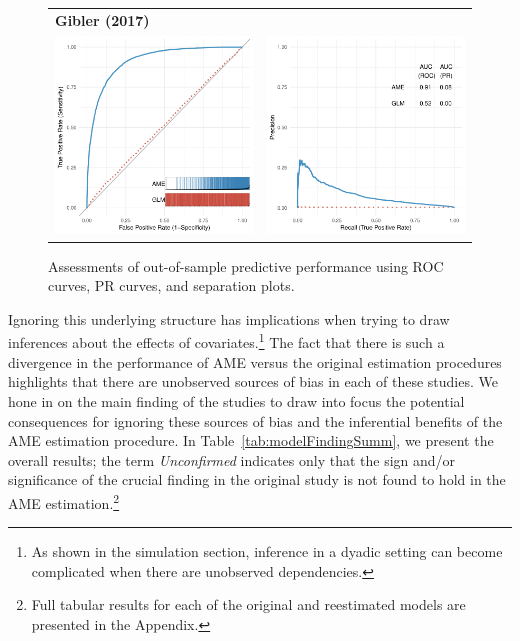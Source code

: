 \begin{figure}
\begin{tabular}{cc}
		\multicolumn{2}{l}{\textbf{\tiny{Gibler (2017)}}} \\
		\includegraphics[width=.4\textwidth]{graphics/gibler_roc_outSample.pdf} & 
		\includegraphics[width=.4\textwidth]{graphics/gibler_pr_outSample.pdf} \\
	\end{tabular}
	\caption{Assessments of out-of-sample predictive performance using ROC curves, PR curves, and separation plots.}
	\label{fig:perf}	
\end{figure}

Ignoring this underlying structure has implications when trying to draw inferences about the effects of covariates.\footnote{As shown in the simulation section, inference in a dyadic setting can become complicated when there are unobserved dependencies.} The fact that there is such a divergence in the performance of AME versus the original estimation procedures highlights that there are unobserved sources of bias in each of these studies. We hone in on the main finding of the studies to draw into focus the potential consequences for ignoring these sources of bias and the inferential benefits of the AME estimation procedure.  In Table~\ref{tab:modelFindingSumm}, we present the overall results; the term \textit{Unconfirmed} indicates only that the sign and/or significance of the crucial finding in the original study is not found to hold in the AME estimation.\footnote{Full tabular results for each of the original and reestimated models are presented in the Appendix.}


